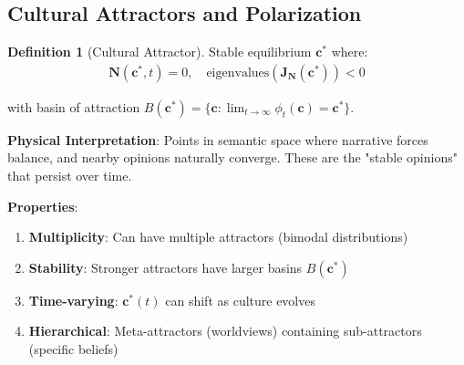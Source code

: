 \documentclass[11pt,a4paper]{article}
\theoremstyle{definition}
\newtheorem{definition}{Definition}[section]
\theoremstyle{remark}
\newcommand{\cc}{\mathbf{c}}
\begin{document}
\begin{enumerate}
\subsection{Cultural Attractors and Polarization}

\begin{definition}[Cultural Attractor]
Stable equilibrium \(\cc^*\) where:
\begin{align}
\mathbf{N}(\cc^*, t) = 0, \quad \text{eigenvalues}(\mathbf{J}_{\mathbf{N}}(\cc^*)) < 0
\end{align}

with basin of attraction \(B(\cc^*) = \{\cc : \lim_{t \to \infty} \phi_t(\cc) = \cc^*\}\).

\textbf{Physical Interpretation}: Points in semantic space where narrative forces balance, and nearby opinions naturally converge. These are the "stable opinions" that persist over time.

\textbf{Properties}:
\begin{enumerate}
    \item \textbf{Multiplicity}: Can have multiple attractors (bimodal distributions)
    \item \textbf{Stability}: Stronger attractors have larger basins \(B(\cc^*)\)
    \item \textbf{Time-varying}: \(\cc^*(t)\) can shift as culture evolves
    \item \textbf{Hierarchical}: Meta-attractors (worldviews) containing sub-attractors (specific beliefs)
\end{enumerate}
\end{definition}

\begin{figure}[H]
\centering
{}
\end{figure}
\end{enumerate}
\end{document}
